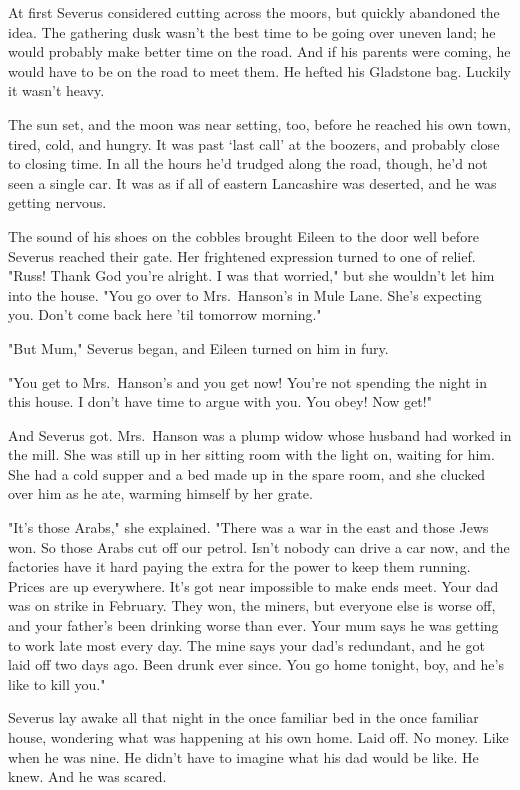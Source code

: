 At first Severus considered cutting across the moors, but quickly abandoned the idea. The gathering dusk wasn't the best time to be going over uneven land; he would probably make better time on the road. And if his parents were coming, he would have to be on the road to meet them. He hefted his Gladstone bag. Luckily it wasn't heavy.

The sun set, and the moon was near setting, too, before he reached his own town, tired, cold, and hungry. It was past `last call' at the boozers, and probably close to closing time. In all the hours he'd trudged along the road, though, he'd not seen a single car. It was as if all of eastern Lancashire was deserted, and he was getting nervous.

The sound of his shoes on the cobbles brought Eileen to the door well before Severus reached their gate. Her frightened expression turned to one of relief. "Russ! Thank God you're alright. I was that worried," but she wouldn't let him into the house. "You go over to Mrs.~Hanson's in Mule Lane. She's expecting you. Don't come back here 'til tomorrow morning."

"But Mum," Severus began, and Eileen turned on him in fury.

"You get to Mrs.~Hanson's and you get now! You're not spending the night in this house. I don't have time to argue with you. You obey! Now get!"

And Severus got. Mrs.~Hanson was a plump widow whose husband had worked in the mill. She was still up in her sitting room with the light on, waiting for him. She had a cold supper and a bed made up in the spare room, and she clucked over him as he ate, warming himself by her grate.

"It's those Arabs," she explained. "There was a war in the east and those Jews won. So those Arabs cut off our petrol. Isn't nobody can drive a car now, and the factories have it hard paying the extra for the power to keep them running. Prices are up everywhere. It's got near impossible to make ends meet. Your dad was on strike in February. They won, the miners, but everyone else is worse off, and your father's been drinking worse than ever. Your mum says he was getting to work late most every day. The mine says your dad's redundant, and he got laid off two days ago. Been drunk ever since. You go home tonight, boy, and he's like to kill you."

Severus lay awake all that night in the once familiar bed in the once familiar house, wondering what was happening at his own home. Laid off. No money. Like when he was nine. He didn't have to imagine what his dad would be like. He knew. And he was scared.

